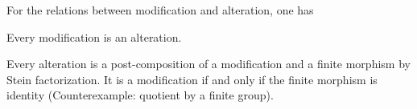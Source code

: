 \documentclass[a4paper, twoside]{article}
\begin{document}
\begin{rmk}
	For the relations between modification and alteration, one has
	\begin{itm}
		\item Every modification is an alteration.
		\item Every alteration is a post-composition of a modification and a finite morphism by Stein factorization. It is a modification if and only if the finite morphism is identity (Counterexample: quotient by a finite group).
	\end{itm}
\end{rmk}



\ifmain
    
    
\fi
\end{document}
